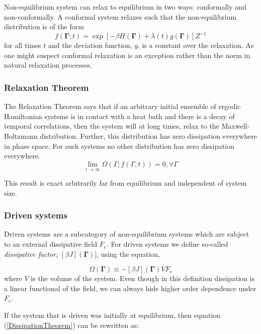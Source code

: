 \documentclass[a4paper,12pt]{article}
\begin{document}
Non-equilibrium system can relax to equilibrium in two ways: conformally and non-conformally.
A conformal system relaxes such that the non-equilibrium distribution is of the form
\begin{equation}
  f(\bm{\Gamma};t)=\exp[-\beta H(\bm{\Gamma})+\lambda(t) g(\bm{\Gamma})] Z^{-1}
\end{equation}
for all times $t$ and the deviation function, $g$, is a constant over the relaxation.
As one might suspect conformal relaxation is an exception rather than the norm in natural relaxation processes.

\subsubsection{Relaxation Theorem}
The Relaxation Theorem says that if an arbitrary initial ensemble of ergodic Hamiltonian systems is in contact with a heat bath and there is a decay of temporal correlations, then the system will at long times, relax to the Maxwell-Boltzmann distribution. Further, this distribution has zero dissipation everywhere in phase space. For such systems no other distribution has zero dissipation everywhere.
\begin{displaymath}
  \lim_{t\to \infty } \Omega (\Gamma ;f(\Gamma ,t))=0, \forall \Gamma
\end{displaymath}

This result is exact arbitrarily far from equilibrium and independent of system size.
\subsubsection{Driven systems}

Driven systems are a subcategory of non-equilibrium systems which are subject to an external dissipative field $F_e$.
For driven systems we define so-called \textit{dissipative factor}, $[\beta J](\bm{\Gamma})]$, using the equation,

\begin{equation}
\label{primaryDissipationFunction}
  \Omega(\bm{\Gamma})\equiv -[\beta J](\bm{\Gamma})V F_e
\end{equation}
where $V$ is the volume of the system.
Even though in this definition dissipation is a linear functional of the field, we can always hide higher order dependence under $F_e$.

If the system that is driven was initially at equilibrium, then equation (\ref{DissipationTheorem}) can be rewritten as:
\end{document}
